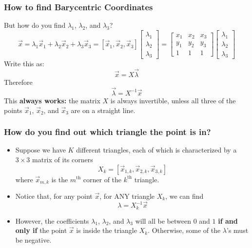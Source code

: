 \documentclass{beamer}
\begin{document}
\begin{frame}
  \frametitle{How to find Barycentric Coordinates}
  But how do you find $\lambda_1$, $\lambda_2$, and $\lambda_3$?
  \[
  \vec{x}=\lambda_1\vec{x}_1+\lambda_2\vec{x}_2+\lambda_3\vec{x}_3
  =\left[\vec{x}_1,\vec{x}_2,\vec{x}_3\right]
  \left[\begin{array}{c}\lambda_1\\\lambda_2\\\lambda_3\end{array}\right]
  =\left[\begin{array}{ccc}x_1&x_2&x_3\\y_1&y_2&y_3\\1&1&1\end{array}\right]
  \left[\begin{array}{c}\lambda_1\\\lambda_2\\\lambda_3\end{array}\right]
  \]
  Write this as:
  \[
  \vec{x}=X\vec\lambda
  \]
  Therefore
  \[
  \vec\lambda = X^{-1}\vec{x}
  \]
  This {\bf always works:} the matrix $X$ is always invertible, unless
  all three of the points $\vec{x}_1$, $\vec{x}_2$, and $\vec{x}_3$
  are on a straight line.
\end{frame}
\begin{frame}
  \frametitle{How do you find out which triangle
    the point is in?}
  \begin{itemize}
  \item Suppose we have $K$ different triangles, each of which is
    characterized by a $3\times 3$ matrix of its corners
    \[
    X_k = \left[\vec{x}_{1,k},\vec{x}_{2,k},\vec{x}_{3,k}\right]
    \]
    where $\vec{x}_{m,k}$ is the $m^{\textrm{th}}$ corner of the
    $k^{\textrm{th}}$ triangle.
  \item Notice that, for any point $\vec{x}$, for ANY triangle $X_k$,
    we can find
    \[\lambda = X_k^{-1}\vec{x}\]
  \item However, the coefficients $\lambda_1$, $\lambda_2$, and
    $\lambda_3$ will all be between $0$ and $1$ {\bf if and only if}
    the point $\vec{x}$ is inside the triangle $X_k$.  Otherwise, some
    of the $\lambda$'s must be negative.
  \end{itemize}
\end{frame}
\end{document}
